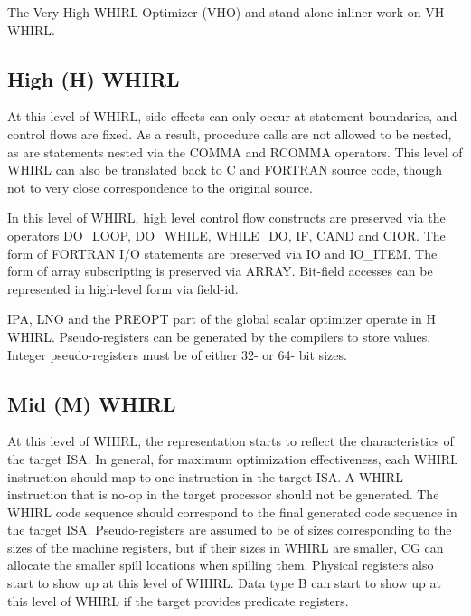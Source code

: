 The Very High WHIRL Optimizer (VHO) and stand-alone inliner work
on VH WHIRL.

\subsection{High (H) WHIRL}

At this level of WHIRL, side effects can only occur at statement
boundaries, and control flows are fixed. As a result, procedure
calls are not allowed to be nested, as are statements nested via
the
%
COMMA and
%
RCOMMA operators. This level of WHIRL can also be
translated back to C and FORTRAN source code, though not to very
close correspondence to the original source. 

In this level of WHIRL, high level control
flow constructs are preserved via the operators
%
DO\_LOOP,
%
DO\_WHILE,
%
WHILE\_DO,
%
IF,
%
CAND and
%
CIOR. The form of FORTRAN
I/O statements are preserved via
%
IO and
%
IO\_ITEM. The form of array subscripting is preserved via
%
ARRAY. Bit-field accesses can be represented in high-level form via
field-id.

IPA, LNO and the PREOPT part of the global scalar optimizer operate
in H WHIRL. Pseudo-registers can be generated by the compilers to
store values. Integer pseudo-registers must be of either 32- or
64- bit sizes.

\subsection{Mid (M) WHIRL}

At this level of WHIRL, the representation starts to reflect the
characteristics of the target ISA. In general, for maximum
optimization effectiveness, each WHIRL instruction should map to
one instruction in the target ISA. A WHIRL instruction that is no-op
in the target processor should not be generated. The WHIRL code
sequence should correspond to the final generated code sequence in the 
target ISA. Pseudo-registers
are assumed to be of sizes corresponding to the sizes of the
machine registers, but if their sizes in WHIRL are smaller, CG can
allocate the smaller spill locations when spilling them. Physical
registers also start to show up at this level of WHIRL. Data type
B can start to show up at this level of WHIRL if the target provides
predicate registers.

